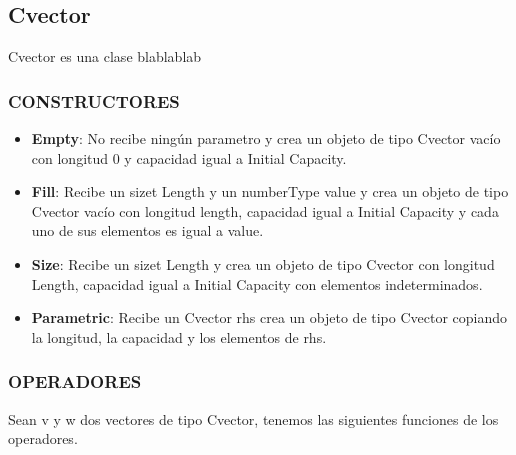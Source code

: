 \documentclass{article}
\begin{document}
\subsection{Cvector}
Cvector es una clase blablablab \\

\subsubsection{\textbf{CONSTRUCTORES}}
\begin{itemize}

	\item \textbf{Empty}: No recibe ningún parametro y crea un objeto de tipo Cvector vacío con longitud 0 y capacidad igual a Initial Capacity.

	\item \textbf{Fill}: Recibe un sizet Length y un numberType value y crea un objeto de tipo Cvector vacío con longitud length, capacidad igual a Initial Capacity y cada uno de sus elementos es igual a value.

	\item \textbf{Size}: Recibe un sizet Length y crea un objeto de tipo Cvector con longitud Length, capacidad igual a Initial Capacity con elementos indeterminados.

	\item \textbf{Parametric}: Recibe un Cvector rhs crea un objeto de tipo Cvector copiando la longitud, la capacidad y los elementos de rhs.

\end{itemize}

\subsubsection{\textbf{OPERADORES}}

Sean v y w dos vectores de tipo Cvector, tenemos las siguientes funciones de los operadores.
\end{document}
